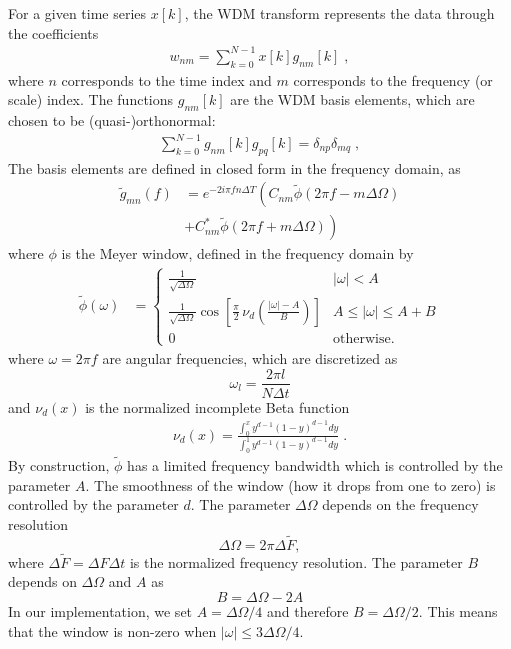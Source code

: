 \documentclass[%
 reprint,
superscriptaddress,
nofootinbib,
 amsmath,amssymb,
 aps,
colorlinks = true, 
linkcolor = blue, 
urlcolor = blue, 
citecolor = blue, 
anchorcolor = blue,
]{revtex4-2}
\begin{document}
For a given time series $x[k]$, the WDM transform represents the data through the coefficients %
\begin{align}
\label{wnm_def}
w_{nm}=\sum_{k=0}^{N-1}x[k]g_{nm}[k]\;,
\end{align}
where $n$ corresponds to the time index and $m$ corresponds to the frequency (or scale) index. The functions $g_{nm}[k]$ are the WDM basis elements, which are chosen to be (quasi-)orthonormal:
\begin{align}
\label{eq:orthonormality}
\sum_{k=0}^{N-1}g_{nm}[k]g_{pq}[k]=\delta_{np}\delta_{mq}\;,
\end{align}
The basis elements are defined in closed form in the frequency domain, as
\begin{align}
\label{eq:gnm}
\tilde g_{mn}(f) & = e^{-2 i \pi f n \Delta T}\left( C_{nm}\tilde\phi(2 \pi f -m\Delta\Omega) \right. \nonumber \\
& \left. +C^*_{nm}\tilde\phi(2\pi f+m\Delta\Omega)\right)
\end{align}
where $\phi$ is the Meyer window, defined in the frequency domain by
\begin{align}
\tilde\phi(\omega) &= \begin{cases}
\frac{1}{\sqrt{\Delta \Omega}} & |\omega|<A \\
\frac{1}{\sqrt{\Delta \Omega}} \cos \left[\frac{\pi}{2}\,\nu_d\left( \frac{|\omega|-A}{B}\right)\right] & A \leq|\omega| \leq A+B \\
0 & \text{otherwise.}
\end{cases}
\end{align}
where $\omega = 2 \pi f$ are angular frequencies, which are discretized as
\begin{equation}
    \omega_l = \frac{2\pi l}{N \Delta t}
\end{equation}
and $\nu_d(x)$ is the normalized incomplete Beta function
\begin{align}
\nu_d(x)=\frac{\int_0^x y^{d-1}(1-y)^{d-1} d y}{\int_0^1 y^{d-1}(1-y)^{d-1} d y}\;.
\end{align}
By construction, $\tilde\phi$ has a limited frequency bandwidth which is controlled by the parameter $A$. The smoothness of the window (how it drops from one to zero) is controlled by the parameter $d$. The parameter $\Delta \Omega$ depends on the frequency resolution
\begin{equation}
    \Delta\Omega = 2 \pi \Delta \tilde{F},
\end{equation}
where $\Delta \tilde{F} = \Delta F \Delta t$ is the normalized frequency resolution.
The parameter $B$ depends on $\Delta\Omega$ and $A$ as
\begin{equation}
    B = \Delta\Omega - 2A
\end{equation}
In our implementation, we set $A =\Delta\Omega/4$ and therefore $B = \Delta\Omega/2$. This means that the window is non-zero when $|\omega| \leq 3 \Delta\Omega/4$.
\end{document}
